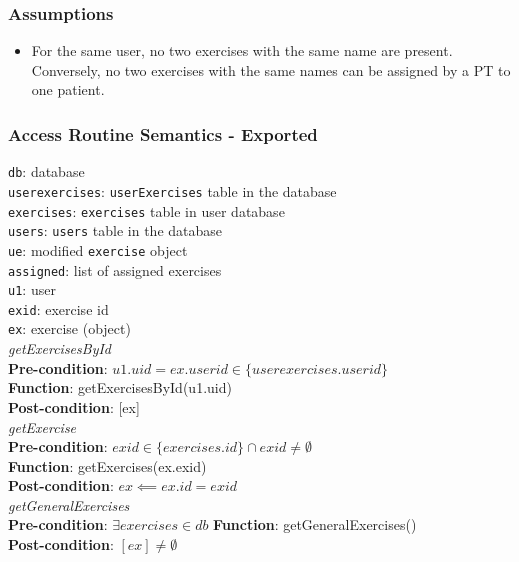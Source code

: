 \documentclass[12pt, titlepage]{article}
\begin{document}
\subsubsection{Assumptions}
\begin{itemize}
  \item For the same user, no two exercises with the same name are present. Conversely, no two 
  exercises with the same names can be assigned by a PT to one patient.
\end{itemize}

\subsubsection{Access Routine Semantics - Exported}
\texttt{db}: database\\
\texttt{userexercises}: \texttt{userExercises} table in the database\\
\texttt{exercises}: \texttt{exercises} table in user database\\
\texttt{users}: \texttt{users} table in the database \\
\texttt{ue}: modified \texttt{exercise} object \\
\texttt{assigned}: list of assigned exercises \\
\texttt{u1}: user \\
\texttt{exid}: exercise id \\
\texttt{ex}: exercise (object) \\
\newline
\textit{getExercisesById}\\
\textbf{Pre-condition}: $u1.uid = ex.userid \in \{userexercises.userid\}$ \\
\textbf{Function}: getExercisesById(u1.uid) \\
\textbf{Post-condition}: [ex]\\
\newline
\textit{getExercise}\\
\textbf{Pre-condition}: $exid \in \{exercises.id\} \cap exid \neq \emptyset$\\
\textbf{Function}: getExercises(ex.exid) \\
\textbf{Post-condition}: $ex \impliedby ex.id = exid $ \\
\newline
\textit{getGeneralExercises}\\
\textbf{Pre-condition}: $\exists exercises \in db $
\textbf{Function}: getGeneralExercises() \\
\textbf{Post-condition}: $[ex] \neq \emptyset$ \\
\end{document}
